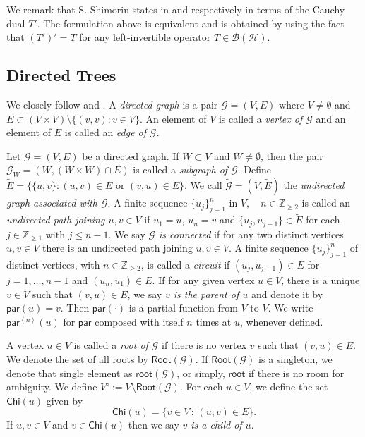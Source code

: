 \documentclass[11pt, reqno, a4paper]{amsart}
\theoremstyle{definition}
\newcommand{\calB}{{\mathcal{B}}}
\newcommand{\calH}{{\mathcal{H}}}
\newcommand{\scrG}{{\mathscr G}}
\newcommand{\ip}[1]{\left\langle #1 \right\rangle}
\renewcommand{\le}{\leqslant}
\renewcommand{\ge}{\geqslant}
\newcommand{\Z}{\mathbb Z}
\newcommand{\Chi}{\mathsf{Chi}}
\newcommand{\pr}{\mathsf{par}}
\numberwithin{equation}{section}
\begin{document}
    We remark that S. Shimorin states  in \cite[Proposition~3.4]{zbMATH01572594} and \cite[Proposition 2.10]{zbMATH01572594} respectively in terms of the Cauchy dual $T'$. The formulation above is equivalent and is obtained by using the fact that $(T')' = T$ for any left-invertible operator $T \in \calB (\calH)$.

\subsection{Directed Trees}
We closely follow \cite[Section 2.1]{MR2919910} and \cite[Section 1.3]{MR3740250}. A \textit{directed graph} is a pair $\scrG = ( V,  E)$ where $V \ne \emptyset$ and $ E \subset (V \times V) \setminus \{ (v,v) : v \in V \}$. An element of $ V$ is called a \textit{vertex of $\scrG$} and an element of $ E$ is called an \textit{edge of $\scrG$}.

Let $\scrG = ( V,  E)$ be a directed graph. If $W \subset V$ and $W \ne \emptyset$, then the pair $\scrG_W =(W, (W \times W) \cap E)$ is called a \textit{subgraph of $\scrG$}. Define $\tilde{ E} = \{ \{ u,v \} : (u,v) \in  E \text{ or } (v,u) \in  E \}$. We call $\tilde{\scrG} = ( V, \tilde{ E})$ the \textit{undirected graph associated with $\scrG$}. A finite sequence $\{ u_j \}_{j=1}^{n}$ in $ V, \quad n \in \Z_{\ge 2}$ is called an \textit{undirected path joining $u,v\in  V$} if $u_1 = u$, $u_n = v$ and $\{ u_j, u_{j+1} \} \in \tilde{ E}$ for each $j \in \Z_{\ge 1}$ with $j \le n-1$. We say \textit{$\scrG$ is connected} if for any two distinct vertices $u,v \in  V$ there is an undirected path joining $u,v \in  V$. A finite sequence $\{u_j\}_{j=1}^{n}$ of distinct vertices, with $n\in\Z_{\ge2}$, is called a \textit{circuit} if $(u_j,u_{j+1})\in E$ for $j=1,\ldots,n-1$ and
$(u_n,u_1)\in E$. If for any given vertex $u \in  V$, there is a unique $v \in  V$ such that $(v,u) \in  E$, we say \textit{$v$ is the parent of $u$} and denote it by $\pr (u)=v$. Then $\pr (\cdot)$ is a partial function from $ V$ to $ V$. We write $\pr^{\ip{n}}(u)$ for $\pr$ composed with itself $n$ times at $u$, whenever defined.
  
  A vertex $u\in  V$ is called a \textit{root of $\scrG$} if there is no vertex $v$ such that $(v,u) \in  E$. We denote the set of all roots by $\mathsf{Root} (\scrG)$. If $\mathsf{Root} (\scrG)$ is a singleton, we denote that single element as $\mathsf{root} (\scrG)$, or simply, $\mathsf{root}$ if there is no room for ambiguity. We define $ V ^{\circ} :=  V \setminus \mathsf{Root} (\scrG)$. For each $u \in  V$, we define the set $\Chi (u)$ given by
\begin{equation*}
    \Chi (u) = \{ v \in  V \, : \, (u, v) \in  E \}.
\end{equation*}
If $u,v \in  V$ and $v \in \Chi (u)$ then we say \textit{$v$ is a child of $u$}.
\end{document}
